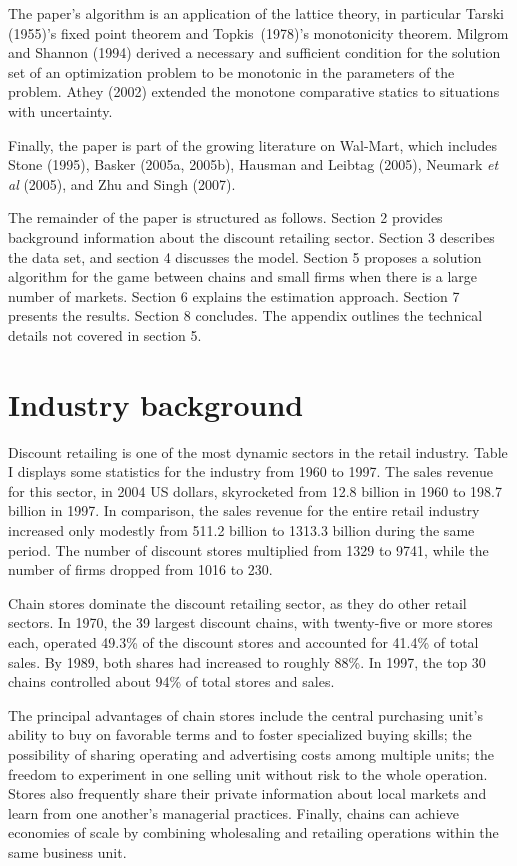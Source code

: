 \documentclass[notitlepage,onecolumn,11pt]{article}
\begin{document}
The paper's algorithm is an application of the lattice theory, in particular
Tarski (1955)'s fixed point theorem and Topkis\ (1978)'s monotonicity
theorem. Milgrom and Shannon (1994) derived a necessary and sufficient
condition for the solution set of an optimization problem to be monotonic in
the parameters of the problem. Athey (2002) extended the monotone
comparative statics to situations with uncertainty.

Finally, the paper is part of the growing literature on Wal-Mart, which
includes Stone (1995), Basker (2005a, 2005b), Hausman and Leibtag (2005),
Neumark \textit{et al} (2005), and Zhu and Singh (2007).

The remainder of the paper is structured as follows. Section 2 provides
background information about the discount retailing sector. Section 3
describes the data set, and section 4 discusses the model. Section 5
proposes a solution algorithm for the game between chains and small firms
when there is a large number of markets. Section 6 explains the estimation
approach. Section 7 presents the results. Section 8 concludes. The appendix
outlines the technical details not covered in section 5.

\section{Industry background}

Discount retailing is one of the most dynamic sectors in the retail
industry. Table I displays some statistics for the industry from 1960 to
1997. The sales revenue for this sector, in 2004 US dollars, skyrocketed
from 12.8 billion in 1960 to 198.7 billion in 1997. In comparison, the sales
revenue for the entire retail industry increased only modestly from 511.2
billion to 1313.3 billion during the same period. The number of discount
stores multiplied from 1329 to 9741, while the number of firms dropped from
1016 to 230.

Chain stores dominate the discount retailing sector, as they do other retail
sectors. In 1970, the 39 largest discount chains, with twenty-five or more
stores each, operated 49.3\% of the discount stores and accounted for 41.4\%
of total sales. By 1989, both shares had increased to roughly 88\%. In 1997,
the top 30 chains controlled about 94\% of total stores and sales.

The principal advantages of chain stores include the central purchasing
unit's ability to buy on favorable terms and to foster specialized buying
skills; the possibility of sharing operating and advertising costs among
multiple units; the freedom to experiment in one selling unit without risk
to the whole operation. Stores also frequently share their private
information about local markets and learn from one another's managerial
practices. Finally, chains can achieve economies of scale by combining
wholesaling and retailing operations within the same business unit.
\end{document}
